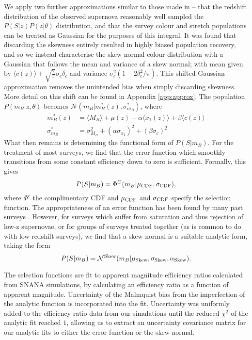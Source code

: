 \documentclass[a4paper,fleqn,usenatbib]{mnras}
\newcommand{\rubin}{\citetalias{Rubin2015}}
\begin{document}
We apply two further approximations similar to those made in {\rubin} -- that the redshift distribution of the observed supernova reasonably well sampled the $P(S|z)P(z|\theta)$ distribution, and that the survey colour and stretch populations can be treated as Gaussian for the purposes of this integral. It was found that discarding the skewness entirely resulted in highly biased population recovery, and so we instead characterise the skew normal colour distribution with a Gaussian that follows the mean and variance of a skew normal; with mean given by $\langle c(z) \rangle + \sqrt{\frac{2}{\pi}} \sigma_c \delta_c$ and variance $\sigma_c^2(1 - 2\delta_c^2/\pi)$. This shifted Gaussian approximation removes the unintended bias when simply discarding skewness. More detail on this shift can be found in Appendix \ref{app:approx}. The population $P(m_B | z, \theta)$ becomes $\mathcal{N}(m_B|m_B^*(z), \sigma^*_{m_B})$, where
\begin{align}
m_B^*(z) &= \langle M_B \rangle + \mu(z) - \alpha \langle x_1(z) \rangle + \beta \langle c(z) \rangle \\
\sigma^*_{m_B} &= \sigma_{M_B}^2 + (\alpha \sigma_{x_1})^2 + (\beta \sigma_c)^2
\end{align}
What then remains is determining the functional form of $P(S|m_B)$. For the treatment of most surveys, we find that the error function which smoothly transitions from some constant efficiency down to zero is sufficient. Formally, this gives
\begin{align}
P(S|m_B) = \Phi^C(m_B | \mu_{\rm CDF}, \sigma_{\rm CDF}),
\end{align}
where $\Phi^c$ the complimentary CDF and $\mu_{\rm CDF}$ and $\sigma_{\rm CDF}$ specify the selection function. The appropriateness of an error function has been found by many past surveys \citep{Dilday2008, Barbary2010, Perrett2012, Graur2013, Rodney2014}. However, for surveys which suffer from saturation and thus rejection of low-z supernovae, or for groups of surveys treated together (as is common to do with low-redshift surveys), we find that a skew normal is a suitable analytic form, taking the form
\begin{align}
P(S|m_B) = \mathcal{N}^{{\rm Skew}}(m_B | \mu_{\rm Skew}, \sigma_{\rm Skew}, \alpha_{\rm Skew}).
\end{align}

The selection functions are fit to apparent magnitude efficiency ratios calculated from SNANA simulations, by calculating an efficiency ratio as a function of apparent magnitude. Uncertainty of the Malmquist bias from the imperfection of the analytic function is incorporated into the fit. Uncertainty was uniformly added to the efficiency ratio data from our simulations until the reduced $\chi^2$ of the analytic fit reached $1$, allowing us to extract an uncertainty covariance matrix for our analytic fits to either the error function or the skew normal.
\end{document}
